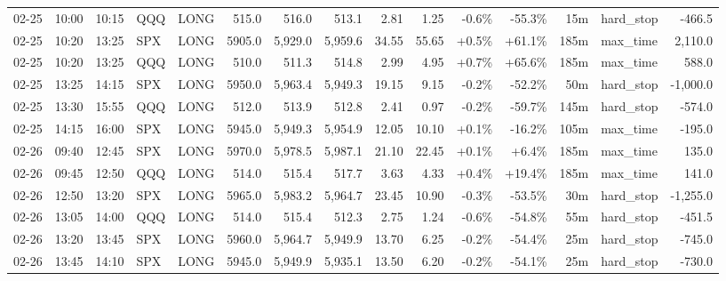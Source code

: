 \documentclass[11pt,a4paper,twoside]{article}
\begin{document}
\begin{landscape}
\begin{center}
\begin{longtable}{>{\color{txtmain}}l l l l l r r r r r r r r >{\color{txtmain}}l r}
02-25 & 10:00 & 10:15 & QQQ & LONG & 515.0 & 516.0 & 513.1 & 2.81 & 1.25 & \textcolor{lossred}{-0.6\%} & \textcolor{lossred}{-55.3\%} & 15m & hard\_stop & \textcolor{lossred}{-466.5} \\
02-25 & 10:20 & 13:25 & SPX & LONG & 5905.0 & 5,929.0 & 5,959.6 & 34.55 & 55.65 & \textcolor{wingreen}{+0.5\%} & \textcolor{wingreen}{+61.1\%} & 185m & max\_time & \textcolor{wingreen}{2,110.0} \\
02-25 & 10:20 & 13:25 & QQQ & LONG & 510.0 & 511.3 & 514.8 & 2.99 & 4.95 & \textcolor{wingreen}{+0.7\%} & \textcolor{wingreen}{+65.6\%} & 185m & max\_time & \textcolor{wingreen}{588.0} \\
02-25 & 13:25 & 14:15 & SPX & LONG & 5950.0 & 5,963.4 & 5,949.3 & 19.15 & 9.15 & \textcolor{lossred}{-0.2\%} & \textcolor{lossred}{-52.2\%} & 50m & hard\_stop & \textcolor{lossred}{-1,000.0} \\
02-25 & 13:30 & 15:55 & QQQ & LONG & 512.0 & 513.9 & 512.8 & 2.41 & 0.97 & \textcolor{lossred}{-0.2\%} & \textcolor{lossred}{-59.7\%} & 145m & hard\_stop & \textcolor{lossred}{-574.0} \\
02-25 & 14:15 & 16:00 & SPX & LONG & 5945.0 & 5,949.3 & 5,954.9 & 12.05 & 10.10 & \textcolor{wingreen}{+0.1\%} & \textcolor{lossred}{-16.2\%} & 105m & max\_time & \textcolor{lossred}{-195.0} \\
02-26 & 09:40 & 12:45 & SPX & LONG & 5970.0 & 5,978.5 & 5,987.1 & 21.10 & 22.45 & \textcolor{wingreen}{+0.1\%} & \textcolor{wingreen}{+6.4\%} & 185m & max\_time & \textcolor{wingreen}{135.0} \\
02-26 & 09:45 & 12:50 & QQQ & LONG & 514.0 & 515.4 & 517.7 & 3.63 & 4.33 & \textcolor{wingreen}{+0.4\%} & \textcolor{wingreen}{+19.4\%} & 185m & max\_time & \textcolor{wingreen}{141.0} \\
02-26 & 12:50 & 13:20 & SPX & LONG & 5965.0 & 5,983.2 & 5,964.7 & 23.45 & 10.90 & \textcolor{lossred}{-0.3\%} & \textcolor{lossred}{-53.5\%} & 30m & hard\_stop & \textcolor{lossred}{-1,255.0} \\
02-26 & 13:05 & 14:00 & QQQ & LONG & 514.0 & 515.4 & 512.3 & 2.75 & 1.24 & \textcolor{lossred}{-0.6\%} & \textcolor{lossred}{-54.8\%} & 55m & hard\_stop & \textcolor{lossred}{-451.5} \\
02-26 & 13:20 & 13:45 & SPX & LONG & 5960.0 & 5,964.7 & 5,949.9 & 13.70 & 6.25 & \textcolor{lossred}{-0.2\%} & \textcolor{lossred}{-54.4\%} & 25m & hard\_stop & \textcolor{lossred}{-745.0} \\
02-26 & 13:45 & 14:10 & SPX & LONG & 5945.0 & 5,949.9 & 5,935.1 & 13.50 & 6.20 & \textcolor{lossred}{-0.2\%} & \textcolor{lossred}{-54.1\%} & 25m & hard\_stop & \textcolor{lossred}{-730.0} \\

\end{longtable}
\end{center}
\end{landscape}
\end{document}
